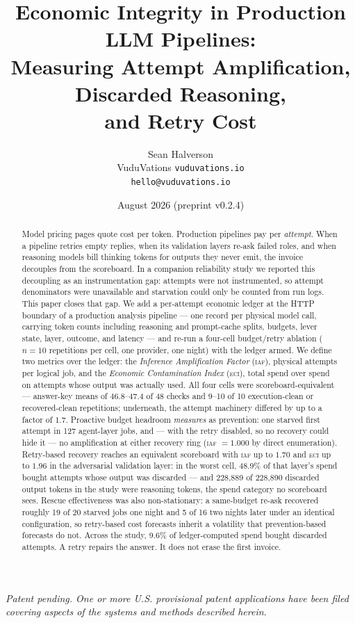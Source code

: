 \documentclass[11pt]{article}
\title{Economic Integrity in Production LLM Pipelines:\\
Measuring Attempt Amplification, Discarded Reasoning,\\
and Retry Cost}
\author{Sean Halverson\\VuduVations \textperiodcentered{} \texttt{vuduvations.io}\\\texttt{hello@vuduvations.io}}
\date{August 2026 \quad (preprint v0.2.4)}
\newcommand{\iaf}{\textsc{iaf}}
\newcommand{\eci}{\textsc{eci}}
\begin{document}
\maketitle

\begin{center}
\small\textit{Patent pending. One or more U.S. provisional patent applications have been filed covering aspects of the systems and methods described herein.}
\end{center}

\begin{abstract}
Model pricing pages quote cost per token. Production pipelines pay per
\emph{attempt}. When a pipeline retries empty replies, when its validation
layers re-ask failed roles, and when reasoning models bill thinking tokens
for outputs they never emit, the invoice decouples from the scoreboard.
In a companion reliability study we reported this decoupling as an
instrumentation gap: attempts were not instrumented, so attempt
denominators were unavailable and starvation could only be counted from
run logs. This paper closes that gap. We add a per-attempt economic
ledger at the HTTP boundary of a production analysis pipeline --- one
record per physical model call, carrying token counts including reasoning
and prompt-cache splits, budgets, lever state, layer, outcome, and
latency --- and re-run a four-cell budget/retry ablation
($n{=}10$ repetitions per cell, one provider, one night) with the ledger
armed. We define two metrics over the ledger: the \emph{Inference
Amplification Factor} (\iaf{}), physical attempts per logical job, and the
\emph{Economic Contamination Index} (\eci{}), total spend over spend on
attempts whose output was actually used. All four cells were
scoreboard-equivalent --- answer-key means of 46.8--47.4 of 48 checks
and 9--10 of 10 execution-clean or recovered-clean repetitions;
underneath, the attempt machinery differed by up to a factor of $1.7$.
Proactive budget headroom \emph{measures} as prevention: one starved
first attempt in 127 agent-layer jobs, and --- with the retry disabled,
so no recovery could hide it --- no amplification at either recovery
ring (\iaf{} $=1.000$ by direct enumeration). Retry-based recovery
reaches an equivalent scoreboard with \iaf{} up to $1.70$ and \eci{} up
to $1.96$ in the
adversarial validation layer: in the worst cell, 48.9\% of that layer's
spend bought attempts whose output was discarded --- and 228,889 of
228,890 discarded output tokens in the study were reasoning tokens, the
spend category no scoreboard sees. Rescue effectiveness was also non-stationary: a
same-budget re-ask recovered roughly 19 of 20 starved jobs one night and
5 of 16 two nights later under an identical configuration, so retry-based
cost forecasts inherit a volatility that prevention-based forecasts do
not. Across the study, 9.6\% of ledger-computed spend bought discarded
attempts. A retry repairs the answer. It does not erase the first
invoice.
\end{abstract}
\end{document}
